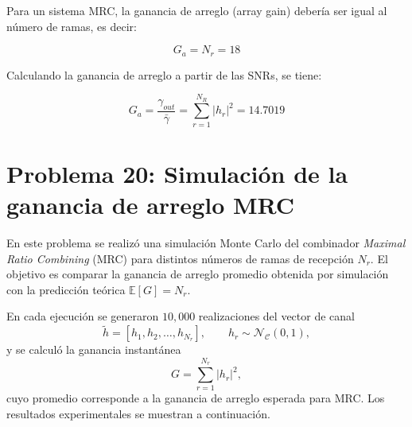 \documentclass[11pt]{article}
\begin{document}
Para un sistema MRC, la ganancia de arreglo (array gain) debería ser igual al número de ramas, es decir:

\[
G_a = N_r = 18
\]

Calculando la ganancia de arreglo a partir de las SNRs, se tiene:

\[
G_a = \frac{\gamma_{out}}{\bar{\gamma}} = \sum_{r=1}^{N_R}|h_r|^2 = 14.7019
\]

\section*{Problema 20: Simulación de la ganancia de arreglo MRC}

En este problema se realizó una simulación Monte Carlo del combinador \emph{Maximal Ratio Combining} (MRC) para distintos números de ramas de recepción $N_r$.
El objetivo es comparar la ganancia de arreglo promedio obtenida por simulación con la predicción teórica $\mathbb{E}[G] = N_r$.  

En cada ejecución se generaron $10{,}000$ realizaciones del vector de canal
\[
\tilde{h} = [h_1, h_2, \dots, h_{N_r}], \qquad h_r \sim \mathcal{N_C}(0,1),
\]
y se calculó la ganancia instantánea
\[
G = \sum_{r=1}^{N_r} |h_r|^2,
\]
cuyo promedio corresponde a la ganancia de arreglo esperada para MRC.  
Los resultados experimentales se muestran a continuación.
\end{document}
